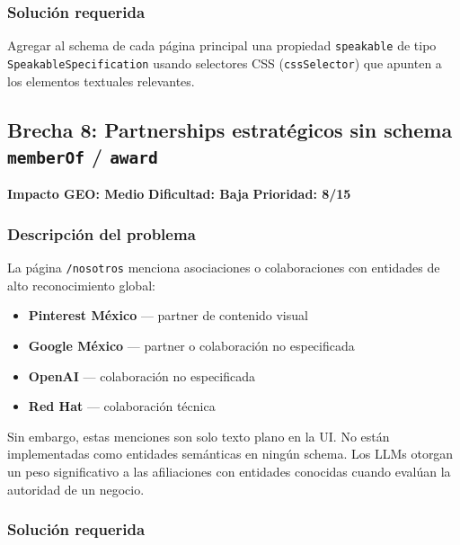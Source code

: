 \documentclass[12pt, a4paper]{article}
\begin{document}
\subsubsection{Solución requerida}

Agregar al schema de cada página principal una propiedad \texttt{speakable} de tipo \texttt{SpeakableSpecification} usando selectores CSS (\texttt{cssSelector}) que apunten a los elementos textuales relevantes.

\subsection{Brecha 8: Partnerships estratégicos sin schema \texttt{memberOf} / \texttt{award}}

\begin{medbox}
\textbf{Impacto GEO: Medio} \quad \textbf{Dificultad: Baja} \quad \textbf{Prioridad: 8/15}
\end{medbox}

\subsubsection{Descripción del problema}

La página \texttt{/nosotros} menciona asociaciones o colaboraciones con entidades de alto reconocimiento global:

\begin{itemize}[itemsep=3pt]
  \item \textbf{Pinterest México} — partner de contenido visual
  \item \textbf{Google México} — partner o colaboración no especificada
  \item \textbf{OpenAI} — colaboración no especificada
  \item \textbf{Red Hat} — colaboración técnica
\end{itemize}

Sin embargo, estas menciones son solo texto plano en la UI. No están implementadas como entidades semánticas en ningún schema. Los LLMs otorgan un peso significativo a las afiliaciones con entidades conocidas cuando evalúan la autoridad de un negocio.

\subsubsection{Solución requerida}
\end{document}
